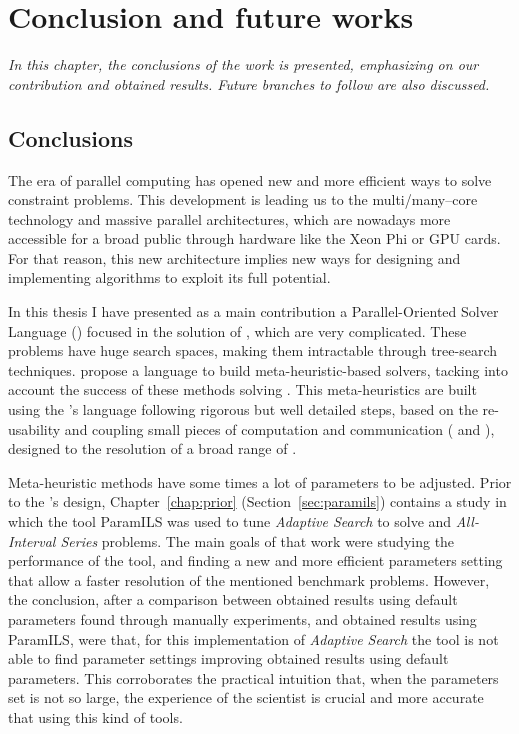 \chapter{Conclusion and future works}
\label{chap:conclusion}
\textit{In this chapter, the conclusions of the work is presented, emphasizing on our contribution and obtained results. Future branches to follow are also discussed.}
\vfill
\minitoc
\newpage

\section{Conclusions}
\label{sec:conclusion_conclusion}

The era of parallel computing has opened new and more efficient ways to solve constraint problems. This development is leading us to the multi/many--core technology and massive parallel architectures, which are nowadays more accessible for a broad public through hardware like the Xeon Phi or GPU cards. For that reason, this new architecture implies new ways for designing and implementing algorithms to exploit its full potential.

In this thesis I have presented as a main contribution a Parallel-Oriented Solver Language (\posl) focused in the solution of \CSPs, which are very complicated. These problems have huge search spaces, making them intractable through tree-search techniques. \posl{} propose a language to build meta-heuristic-based solvers, tacking into account the success of these methods solving \csps{}. This meta-heuristics are built using the \posl's language following rigorous but well detailed steps, based on the re-usability and coupling small pieces of computation and communication (\oms{} and \opchs), designed to the resolution of a broad range of \csps. 

Meta-heuristic methods have some times a lot of parameters to be adjusted. Prior to the \posl{}'s design, Chapter~\ref{chap:prior} (Section~\ref{sec:paramils}) contains a study in which the tool {\sc ParamILS} was used to tune {\it Adaptive Search} to solve \carr{} and {\it All-Interval Series} problems. The main goals of that work were studying the performance of the tool, and finding a new and more efficient parameters setting that allow a faster resolution of the mentioned benchmark problems. However, the conclusion, after a comparison between obtained results using default parameters found through manually experiments, and obtained results using {\sc ParamILS}, were that, for this implementation of {\it Adaptive Search} the tool is not able to find parameter settings improving obtained results using default parameters. This corroborates the practical intuition that, when the parameters set is not so large, the experience of the scientist is crucial and more accurate that using this kind of tools.

